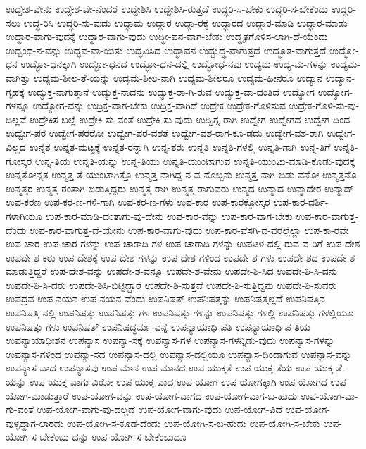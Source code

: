 {ಉದ್ದೇಶ-ವೇನು
ಉದ್ದೇಶ-ವೇ-ನೆಂದರೆ
ಉದ್ದೇಶಿಸಿ
ಉದ್ದೇಶಿಸಿ-ರುತ್ತದೆ
ಉದ್ಧರಿ-ಸ-ಬೇಕು
ಉದ್ಧರಿ-ಸ-ಬೇಕೆಂದು
ಉದ್ಧರಿ-ಸಲು
ಉದ್ಧ-ರಿಸಿ
ಉದ್ಧರಿ-ಸು-ವುದು
ಉದ್ಧಾಮ
ಉದ್ಧಾರ
ಉದ್ಧಾ-ರಕ್ಕೆ
ಉದ್ಧಾರದ
ಉದ್ಧಾರ-ಮಾಡಿ
ಉದ್ಧಾರ-ಮಾಡು
ಉದ್ಧಾರ-ವಾಗು-ವುದಕ್ಕೆ
ಉದ್ಧಾರ-ವಾಗು-ವುದು
ಉದ್ಧೀ-ಪನ-ವಾಗ-ಬೇಕು
ಉದ್ಧೃತಗೊಳಿಸ-ಲಾಗಿ-ದೆ-ಯೆಂದು
ಉದ್ಬಂಧ-ನ-ವನ್ನು
ಉದ್ಭವ-ವಾ-ಯಿತು
ಉದ್ಭವಿಸಿದ
ಉದ್ಭಾವನ
ಉದ್ಭುದ್ಧ-ವಾಗುತ್ತದೆ
ಉದ್ಭೂತ-ವಾಗುತ್ತದೆ
ಉದ್ಭೋ-ಧನ
ಉದ್ಭೋ-ಧನಕ್ಕಾಗಿ
ಉದ್ಭೋ-ಧನದ
ಉದ್ಭೋ-ಧನ-ದಲ್ಲಿ
ಉದ್ಭೋಧ-ನವು
ಉದ್ಯಮ
ಉದ್ಯ-ಮ-ಗಳನ್ನು
ಉದ್ಯಮ-ವಾಗಿತ್ತು
ಉದ್ಯಮ-ಶೀಲ-ತೆ-ಯನ್ನು
ಉದ್ಯಮ-ಶೀಲ-ನಾಗಿ
ಉದ್ಯಮ-ಶೀಲರೂ
ಉದ್ಯಮ-ಹೀನರೂ
ಉದ್ಯಾನ
ಉದ್ಯಾನ-ಗೃಹಕ್ಕೆ
ಉದ್ಯುಕ್ತ-ನಾಗುತ್ತಾನೆ
ಉದ್ಯುಕ್ತ-ನಾದನು
ಉದ್ಯುಕ್ತ-ರಾ-ಗಿ-ರುವ
ಉದ್ಯುಕ್ತ-ವಾ-ದಂತಿದೆ
ಉದ್ಯೋಗ
ಉದ್ಯೋಗ-ಗಳನ್ನೂ
ಉದ್ಯೋಗ-ವನ್ನು
ಉದ್ರಿಕ್ತ-ವಾಗ-ಬೇಕು
ಉದ್ರಿಕ್ತ-ವಾಗಿದೆ
ಉದ್ರೇಕ
ಉದ್ರೇಕ-ಗೊಳಿಸುವ
ಉದ್ರೇಕ-ಗೊಳಿ-ಸು-ವು-ದಿಲ್ಲವೆ
ಉದ್ರೇಕಿಸ-ಬಲ್ಲೆ
ಉದ್ರೇಕಿ-ಸು-ವಂತೆ
ಉದ್ರೇಕಿ-ಸು-ವುದು
ಉದ್ವಿಗ್ನ-ರಾಗಿ
ಉದ್ವೇಗ
ಉದ್ವೇಗದ
ಉದ್ವೇಗ-ದಿಂದ
ಉದ್ವೇಗ-ಪರ
ಉದ್ವೇಗ-ಪರರೋ
ಉದ್ವೇಗ-ಪರ-ವಶತೆ
ಉದ್ವೇಗ-ವಶ-ರಾಗ-ಕೂ-ಡದು
ಉದ್ವೇಗ-ವಶ-ರಾಗಿ
ಉದ್ವೇಗ-ವಿಲ್ಲದ
ಉನ್ನತ
ಉನ್ನತ-ಮಟ್ಟಕ್ಕೆ
ಉನ್ನತ-ರನ್ನಾಗಿ
ಉನ್ನ-ತರು
ಉನ್ನತಿ
ಉನ್ನತಿ-ಗಳಲ್ಲಿ
ಉನ್ನತಿ-ಗಾಗಿ
ಉನ್ನ-ತಿಗೆ
ಉನ್ನತಿ-ಗೋಸ್ಕರ
ಉನ್ನ-ತಿಯ
ಉನ್ನತಿ-ಯನ್ನು
ಉನ್ನ-ತಿಯು
ಉನ್ನತಿ-ಯುಂಟಾಗುವ
ಉನ್ನತಿ-ಯುಂಟು-ಮಾಡಿ-ಕೊಡು-ವುದಕ್ಕೆ
ಉನ್ನತೋನ್ನತ
ಉನ್ಮತ್ತ-ತೆ-ಯುಂಟಾಗಿತ್ತೊ
ಉನ್ಮತ್ತ-ನಾಗಿದ್ದ-ನ-ವ-ನೊಬ್ಬನು
ಉನ್ಮತ್ತ-ನಾಗಿ-ಬಿಡು-ವನೋ
ಉನ್ಮತ್ತನೊ
ಉನ್ಮತ್ತರ
ಉನ್ಮತ್ತ-ರಂತಾಗಿ-ಬಿಡುತ್ತಿದ್ದರು
ಉನ್ಮತ್ತ-ರಾಗಿ
ಉನ್ಮತ್ತ-ರಾಗುವರು
ಉನ್ಮದ
ಉನ್ಮಾದ
ಉನ್ಮಾದೇರ
ಉನ್ಮಾದ್
ಉಪ-ಕರಣ
ಉಪ-ಕರ-ಣ-ಗಳಿ-ಗಾಗಿ
ಉಪ-ಕರ-ಣ-ಗಳು
ಉಪ-ಕಾರ
ಉಪ-ಕಾರಕ್ಕೋಸ್ಕರ
ಉಪ-ಕಾರ-ದರ್ಶಿ-ಗಳಾಗಿಯೂ
ಉಪ-ಕಾರ-ಮಾಡಿ-ದಂತಾಗು-ವು-ದೇನು
ಉಪ-ಕಾರ-ವನ್ನು
ಉಪ-ಕಾರ-ವಾಗ-ಬೇಕು
ಉಪ-ಕಾರ-ವಾಗುತ್ತ-ದೆಂದು
ಉಪ-ಕಾರ-ವಾಗುತ್ತ-ದೆ-ಯೇನು
ಉಪ-ಕಾರ-ವಾಗು-ವುದು
ಉಪ-ಕಾರ-ವೆಸಗಿ-ದ-ವರಲ್ಲೆಲ್ಲಾ
ಉಪ-ಕಾ-ರವೇ
ಉಪ-ಚಾರ
ಉಪ-ಚಾರ-ಗಳನ್ನು
ಉಪ-ಚಾರಾದಿ-ಗಳ
ಉಪ-ಚಾರಾದಿ-ಗಳನ್ನು
ಉಪಟಳ-ದಲ್ಲಿ-ರುವ-ವ-ರಿಗೆ
ಉಪ-ದೇಶ
ಉಪದೇ-ಶ-ಕರು
ಉಪ-ದೇಶಕ್ಕೆ
ಉಪ-ದೇಶ-ಗಳನ್ನು
ಉಪ-ದೇಶ-ಗಳಿಂದ
ಉಪದೇ-ಶ-ಗಳು
ಉಪದೇ-ಶದ
ಉಪದೇ-ಶ-ಮಾಡುತ್ತಿದ್ದರೆ
ಉಪ-ದೇಶ-ವನ್ನು
ಉಪದೇ-ಶ-ವನ್ನೂ
ಉಪದೇ-ಶ-ವೇನು
ಉಪದೇ-ಶಿ-ಸಿದ
ಉಪದೇ-ಶಿ-ಸಿ-ದನು
ಉಪದೇ-ಶಿ-ಸಿ-ದರು
ಉಪದೇ-ಶಿಸಿ-ಬಿಟ್ಟಿದ್ದಾರೆ
ಉಪದೇ-ಶಿ-ಸುತ್ತವೆ
ಉಪದೇ-ಶಿ-ಸುತ್ತಿದ್ದನು
ಉಪದೇ-ಶಿ-ಸುವರು
ಉಪದ್ರವ
ಉಪ-ನಯನ
ಉಪ-ನಯನ-ವೆಂದು
ಉಪನಿಷತ್
ಉಪನಿಷತ್ತನ್ನು
ಉಪನಿಷತ್ತಲ್ಲದೆ
ಉಪನಿಷತ್ತಿನ
ಉಪನಿಷತ್ತಿ-ನಲ್ಲಿ
ಉಪನಿಷತ್ತು
ಉಪನಿಷತ್ತು-ಗಳ
ಉಪನಿಷತ್ತು-ಗಳನ್ನು
ಉಪನಿಷತ್ತು-ಗಳಲ್ಲಿ
ಉಪನಿಷತ್ತು-ಗಳಲ್ಲಿಯೂ
ಉಪನಿಷತ್ತು-ಗಳು
ಉಪನಿಷತ್
ಉಪನಿಷದ್ಧರ್ಮ-ವನ್ನೆ
ಉಪನ್ಯಾಯಾಧಿ-ಪತಿ
ಉಪನ್ಯಾಯಾಧಿ-ಪ-ತಿಯ
ಉಪನ್ಯಾಯಾಧೀಶನ
ಉಪನ್ಯಾಸ
ಉಪನ್ಯಾ-ಸಕ್ಕೆ
ಉಪನ್ಯಾಸ-ಗಳ
ಉಪನ್ಯಾಸ-ಗಳನ್ನಿಡು-ವುದು
ಉಪನ್ಯಾಸ-ಗಳನ್ನು
ಉಪನ್ಯಾಸ-ಗಳಿಂದ
ಉಪನ್ಯಾ-ಸದ
ಉಪನ್ಯಾಸ-ದಲ್ಲಿ
ಉಪನ್ಯಾಸ-ದಲ್ಲಿಯೂ
ಉಪನ್ಯಾಸ-ದಿಂದಾಗುವ
ಉಪನ್ಯಾಸ-ವನ್ನು
ಉಪನ್ಯಾಸ-ವಾದ
ಉಪನ್ಯಾಸವು
ಉಪ-ಮಾನ
ಉಪ-ಮಾನದ
ಉಪ-ಯುಕ್ತತೆ
ಉಪ-ಯುಕ್ತ-ತೆಯ
ಉಪ-ಯುಕ್ತ-ತೆ-ಯನ್ನು
ಉಪ-ಯುಕ್ತ-ವಾಗು-ವಿರೋ
ಉಪ-ಯುಕ್ತ-ವಾದ
ಉಪ-ಯೋಗ
ಉಪ-ಯೋಗಕ್ಕಾಗಿ
ಉಪ-ಯೋಗದ
ಉಪ-ಯೋಗ-ಮಾಡುತ್ತಾರೆ
ಉಪ-ಯೋಗ-ವನ್ನು
ಉಪ-ಯೋಗ-ವಾಗದ
ಉಪ-ಯೋಗ-ವಾಗ-ಬ-ಹುದು
ಉಪ-ಯೋಗ-ವಾ-ಗು-ವಂತೆ
ಉಪ-ಯೋಗ-ವಾಗು-ವು-ದಲ್ಲದೆ
ಉಪ-ಯೋಗ-ವಾಗು-ವುದು
ಉಪ-ಯೋಗ-ವಿದೆ
ಉಪ-ಯೋಗ-ವುಳ್ಳದ್ದಾಗ-ಲಾರದು
ಉಪ-ಯೋಗಿ-ಸ-ಕೂಡ-ದೆಂದು
ಉಪ-ಯೋಗಿ-ಸ-ಬ-ಹುದು
ಉಪ-ಯೋಗಿ-ಸ-ಬೇಕು
ಉಪ-ಯೋಗಿ-ಸ-ಬೇಕೆಂಬು-ದನ್ನು
ಉಪ-ಯೋಗಿ-ಸ-ಬೇಕೆಂಬುದೂ
}
